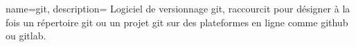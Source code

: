 
{%
    name={git},
    description={
    Logiciel de versionnage git, raccourcit pour désigner à la fois un répertoire git ou un projet git sur des plateformes en ligne comme github ou gitlab.
    }
}

